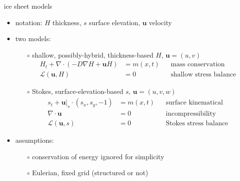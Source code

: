 \documentclass[hide notes,intlimits,usenames,dvipsnames]{beamer}
\newcommand{\Div}{\nabla\cdot}
\newcommand{\grad}{\nabla}
\begin{document}
\begin{frame}{ice sheet models}

\begin{itemize}
\item notation: $H$ thickness, $s$ surface elevation, $\mathbf{u}$ velocity
\item two models:
    \begin{itemize}
    \item[$\circ$] shallow, possibly-hybrid, thickness-based \hfill {\scriptsize\color{Gray} $H,\, \mathbf{u}=(u,v)$}
        \begin{align*}
        H_t + \Div (-D \grad H + \mathbf{u} H) &= m(x,t) && \text{mass conservation} \\
        \mathcal{L}(\mathbf{u},H) &= 0      && \text{shallow stress balance}
        \end{align*}
    \item[$\circ$] Stokes, surface-elevation-based \hfill {\scriptsize\color{Gray} $s,\, \mathbf{u}=(u,v,w)$}
        \begin{align*}
        s_t + \mathbf{u}\big|_s \cdot (s_x,s_y,-1) &= m(x,t) && \text{surface kinematical} \\
        \Div \mathbf{u} &= 0            && \text{incompressibility} \\
        \mathcal{L}(\mathbf{u},s) &= 0  && \text{Stokes stress balance}
        \end{align*}
    \end{itemize}
\item assumptions:
    \begin{itemize}
    \item[$\circ$] conservation of energy ignored for simplicity
    \item[$\circ$] Eulerian, fixed grid (structured or not)
    \end{itemize}
\end{itemize}
\end{frame}
\end{document}
